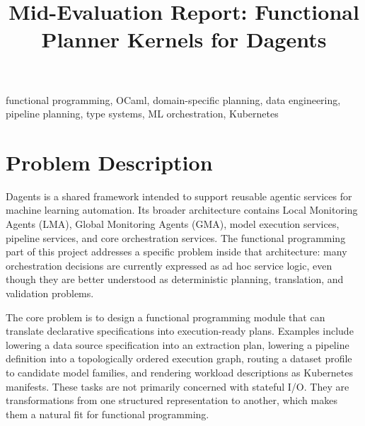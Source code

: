 \documentclass[conference]{IEEEtran}
\title{Mid-Evaluation Report: Functional Planner Kernels for Dagents}
\author{
\IEEEauthorblockN{Pradyun Devarakonda \quad Dheeraj Rajanala}
\IEEEauthorblockA{
Course Project for Programming Languages\\
Roll Number: IMT2022525, IMT2022093}
}
\begin{document}
\maketitle


\begin{IEEEkeywords}
functional programming, OCaml, domain-specific planning, data engineering,
pipeline planning, type systems, ML orchestration, Kubernetes
\end{IEEEkeywords}

\section{Problem Description}

Dagents is a shared framework intended to support reusable agentic services for
machine learning automation. Its broader architecture contains Local Monitoring
Agents (LMA), Global Monitoring Agents (GMA), model execution services, pipeline
services, and core orchestration services. The functional programming part of
this project addresses a specific problem inside that architecture: many
orchestration decisions are currently expressed as ad hoc service logic, even
though they are better understood as deterministic planning, translation, and
validation problems.

The core problem is to design a functional programming module that can translate
declarative specifications into execution-ready plans. Examples include
lowering a data source specification into an extraction plan, lowering a
pipeline definition into a topologically ordered execution graph, routing a
dataset profile to candidate model families, and rendering workload
descriptions as Kubernetes manifests. These tasks are not primarily concerned
with stateful I/O. They are transformations from one structured representation
to another, which makes them a natural fit for functional programming.
\end{document}
